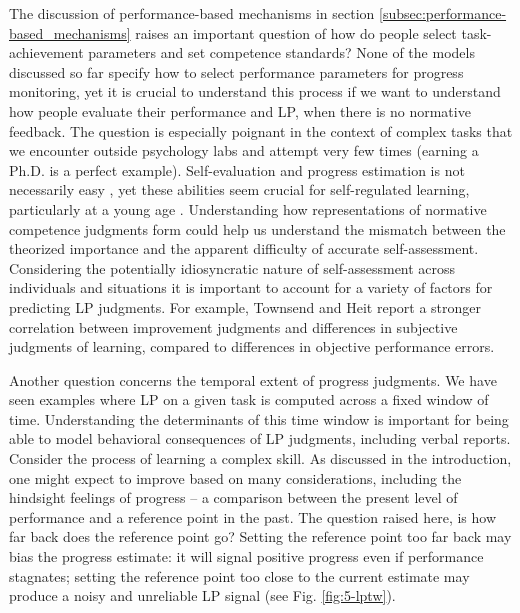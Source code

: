 The discussion of performance-based mechanisms in section \autoref{subsec:performance-based_mechanisms} raises an important question of how do people select task-achievement parameters and set competence standards? None of the models discussed so far specify how to select performance parameters for progress monitoring, yet it is crucial to understand this process if we want to understand how people evaluate their performance and \ac{LP}, when there is no normative feedback. The question is especially poignant in the context of complex tasks that we encounter outside psychology labs and attempt very few times (earning a Ph.D. is a perfect example). Self-evaluation and progress estimation is not necessarily easy \cite{townsend_judgments_2011,raaijmakers_effects_2019}, yet these abilities seem crucial for self-regulated learning, particularly at a young age \cite{oudeyer_computational_2018}. Understanding how representations of normative competence judgments form could help us understand the mismatch between the theorized importance and the apparent difficulty of accurate self-assessment. Considering the potentially idiosyncratic nature of self-assessment across individuals and situations \cite{boekaerts_subjective_1991} it is important to account for a variety of factors for predicting \ac{LP} judgments. For example, Townsend and Heit \cite{townsend_judgments_2011} report a stronger correlation between improvement judgments and differences in subjective judgments of learning, compared to differences in objective performance errors.

Another question concerns the temporal extent of progress judgments. We have seen examples where \ac{LP} on a given task is computed across a fixed window of time. Understanding the determinants of this time window is important for being able to model behavioral consequences of \ac{LP} judgments, including verbal reports.  Consider the process of learning a complex skill. As discussed in the introduction, one might expect to improve based on many considerations, including the hindsight feelings of progress -- a comparison between the present level of performance and a reference point in the past. The question raised here, is how far back does the reference point go? Setting the reference point too far back may bias the progress estimate: it will signal positive progress even if performance stagnates; setting the reference point too close to the current estimate may produce a noisy and unreliable 
\ac{LP} signal (see Fig. \ref{fig:5-lptw}).

